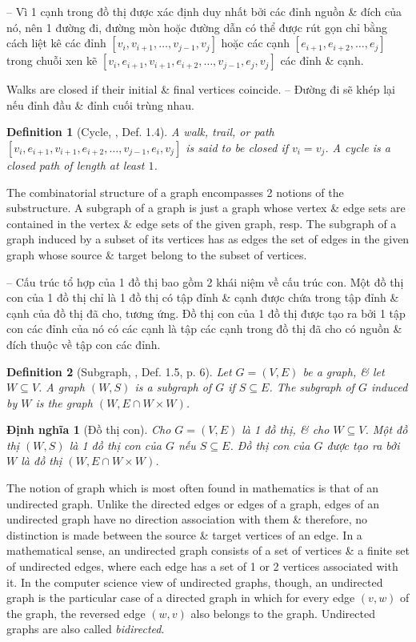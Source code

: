 \documentclass[oneside]{book}
\newtheorem{definition}{Definition}
\newtheorem{dinhnghia}{Định nghĩa}
\begin{document}
-- Vì 1 cạnh trong đồ thị được xác định duy nhất bởi các đỉnh nguồn \& đích của nó, nên 1 đường đi, đường mòn hoặc đường dẫn có thể được rút gọn chỉ bằng cách liệt kê các đỉnh $[v_i,v_{i+1},\ldots,v_{j-1},v_j]$ hoặc các cạnh $[e_{i+1},e_{i+2},\ldots,e_j]$ trong chuỗi xen kẽ $[v_i,e_{i+1},v_{i+1},e_{i+2},\ldots,v_{j-1},e_j,v_j]$ các đỉnh \& cạnh.

Walks are closed if their initial \& final vertices coincide. -- Đường đi sẽ khép lại nếu đỉnh đầu \& đỉnh cuối trùng nhau.

\begin{definition}[Cycle, \cite{Valiente2021}, Def. 1.4]
	A walk, trail, or path $[v_i,e_{i+1},v_{i+1},e_{i+2},\ldots,v_{j-1},e_i,v_j]$ is said to be {\rm closed} if $v_i = v_j$. A {\rm cycle} is a closed path of length at least $1$.
\end{definition}
The combinatorial structure of a graph encompasses 2 notions of the substructure. A subgraph of a graph is just a graph whose vertex \& edge sets are contained in the vertex \& edge sets of the given graph, resp. The subgraph of a graph induced by a subset of its vertices has as edges the set of edges in the given graph whose source \& target belong to the subset of vertices.

-- Cấu trúc tổ hợp của 1 đồ thị bao gồm 2 khái niệm về cấu trúc con. Một đồ thị con của 1 đồ thị chỉ là 1 đồ thị có tập đỉnh \& cạnh được chứa trong tập đỉnh \& cạnh của đồ thị đã cho, tương ứng. Đồ thị con của 1 đồ thị được tạo ra bởi 1 tập con các đỉnh của nó có các cạnh là tập các cạnh trong đồ thị đã cho có nguồn \& đích thuộc về tập con các đỉnh.

\begin{definition}[Subgraph, \cite{Valiente2021}, Def. 1.5, p. 6]
	Let $G = (V,E)$ be a graph, \& let $W\subseteq V$. A graph $(W,S)$ is a {\rm subgraph} of $G$ if $S\subseteq E$. The subgraph of $G$ {\rm induced} by $W$ is the graph $(W,E\cap W\times W)$.
\end{definition}

\begin{dinhnghia}[Đồ thị con]
	Cho $G = (V,E)$ là 1 đồ thị, \& cho $W\subseteq V$. Một đồ thị $(W,S)$ là 1 {\rm đồ thị con} của $G$ nếu $S\subseteq E$. Đồ thị con của $G$ {\rm được tạo ra} bởi $W$ là đồ thị $(W,E\cap W\times W)$.
\end{dinhnghia}
The notion of graph which is most often found in mathematics is that of an undirected graph. Unlike the directed edges or edges of a graph, edges of an undirected graph have no direction association with them \& therefore, no distinction is made between the source \& target vertices of an edge. In a mathematical sense, an undirected graph consists of a set of vertices \& a finite set of undirected edges, where each edge has a set of 1 or 2 vertices associated with it. In the computer science view of undirected graphs, though, an undirected graph is the particular case of a directed graph in which for every edge $(v,w)$ of the graph, the reversed edge $(w,v)$ also belongs to the graph. Undirected graphs are also called {\it bidirected}.
\end{document}
